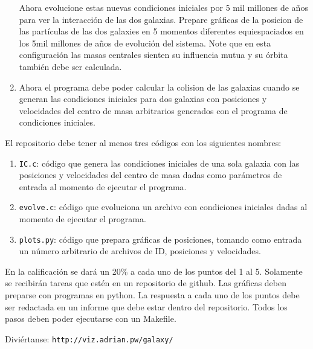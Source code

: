 \documentclass{article}
\begin{document}
\begin{enumerate}
  Ahora
  evolucione estas nuevas condiciones iniciales por 5 mil millones de
  a\~nos para ver la interacci\'on de las dos galaxias.  Prepare
  gr\'aficas de la posicion de las part\'iculas de las dos galaxies en
  5 momentos diferentes equiespaciados en los  5mil millones de a\~nos
  de evoluci\'on del sistema. 
  Note que en esta configuraci\'on las masas centrales sienten su
  influencia mutua y su \'orbita tambi\'en debe ser calculada.

\item
  Ahora el programa debe poder calcular la colision de las galaxias
  cuando se generan las condiciones iniciales para dos galaxias con
  posiciones y velocidades del centro de masa arbitrarios generados
  con el programa de condiciones iniciales.

\end{enumerate}

El repositorio debe tener al menos tres c\'odigos con los siguientes nombres:

\begin{enumerate}
\item \verb"IC.c": c\'odigo que genera las condiciones iniciales de
  una sola galaxia con las posiciones y velocidades del centro de masa
  dadas como par\'ametros de entrada al momento de ejecutar el programa.
\item \verb"evolve.c": c\'odigo que evoluciona un archivo con 
  condiciones iniciales dadas al momento de ejecutar el programa.
\item \verb"plots.py": c\'odigo que prepara gr\'aficas de
  posiciones, tomando como entrada un n\'umero
  arbitrario de archivos de ID, posiciones y velocidades.
\end{enumerate}


En la calificaci\'on se dar\'a un 20\% a cada uno de los puntos del 1
al 5. Solamente se recibir\'an tareas que est\'en en un repositorio de
github. Las gr\'aficas deben preparse con programas en python. La
respuesta a cada uno de los puntos debe ser redactada en un informe
que debe estar dentro del repositorio. Todos los pasos deben poder
ejecutarse con un Makefile.



Divi\'ertanse: \verb"http://viz.adrian.pw/galaxy/"
\end{document}
